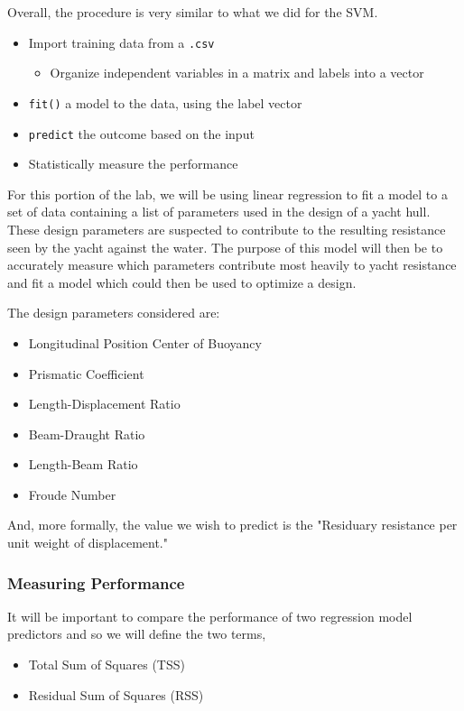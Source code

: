 \documentclass[11pt,a4paper]{article}
\begin{document}
Overall, the procedure is very similar to what we did for the SVM.

\begin{itemize}
\item Import training data from a \verb|.csv|
	\begin{itemize}
		\item Organize independent variables in a matrix and labels into a vector
	\end{itemize}
\item \verb|fit()| a model to the data, using the label vector
\item \verb|predict| the outcome based on the input
\item Statistically measure the performance
\end{itemize}

For this portion of the lab, we will be using linear regression to fit a model to a set of data containing a list of parameters used in the design of a yacht hull. These design parameters are suspected to contribute to the resulting resistance seen by the yacht against the water. The purpose of this model will then be to accurately measure which parameters contribute most heavily to yacht resistance and fit a model which could then be used to optimize a design.

The design parameters considered are:

\begin{itemize}
\item Longitudinal Position Center of Buoyancy
\item Prismatic Coefficient
\item Length-Displacement Ratio
\item Beam-Draught Ratio
\item Length-Beam Ratio
\item Froude Number
\end{itemize}

And, more formally, the value we wish to predict is the "Residuary resistance per unit weight of displacement."

\subsubsection{Measuring Performance}
It will be important to compare the performance of two regression model predictors and so we will define the two terms,

\begin{itemize}
\item Total Sum of Squares (TSS)
\item Residual Sum of Squares (RSS)
\end{itemize}
\end{document}
